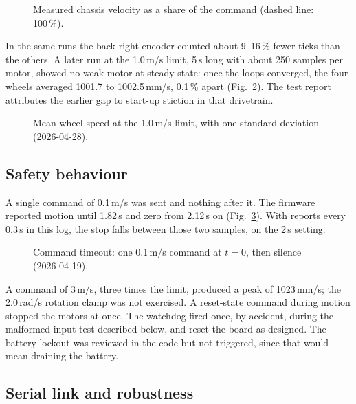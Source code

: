 \documentclass[11pt]{article}
\begin{document}
\begin{figure}[htbp]
  \centering
  
  \caption{Measured chassis velocity as a share of the command (dashed line: 100\,\%).}
  \label{fig:vel}
\end{figure}

In the same runs the back-right encoder counted about 9--16\,\% fewer ticks than the others. A later run at the 1.0\,m/s limit, 5\,s long with about 250 samples per motor, showed no weak motor at steady state: once the loops converged, the four wheels averaged 1001.7 to 1002.5\,mm/s, 0.1\,\% apart (Fig.~\ref{fig:motors}). The test report attributes the earlier gap to start-up stiction in that drivetrain.

\begin{figure}[htbp]
  \centering
  
  \caption{Mean wheel speed at the 1.0\,m/s limit, with one standard deviation (2026-04-28).}
  \label{fig:motors}
\end{figure}

\subsection{Safety behaviour}

A single command of 0.1\,m/s was sent and nothing after it. The firmware reported motion until 1.82\,s and zero from 2.12\,s on (Fig.~\ref{fig:timeout}). With reports every 0.3\,s in this log, the stop falls between those two samples, on the 2\,s setting.

\begin{figure}[htbp]
  \centering
  
  \caption{Command timeout: one 0.1\,m/s command at $t = 0$, then silence (2026-04-19).}
  \label{fig:timeout}
\end{figure}

A command of 3\,m/s, three times the limit, produced a peak of 1023\,mm/s; the 2.0\,rad/s rotation clamp was not exercised. A reset-state command during motion stopped the motors at once. The watchdog fired once, by accident, during the malformed-input test described below, and reset the board as designed. The battery lockout was reviewed in the code but not triggered, since that would mean draining the battery.

\subsection{Serial link and robustness}
\end{document}
